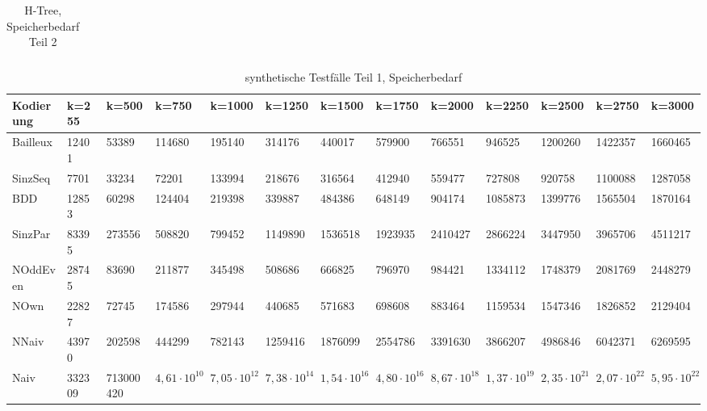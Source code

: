 \documentclass[a4,abstract=on]{scrartcl}
\begin{document}
\begin{landscape}
\begin{table}[h!]
\begin{tabular}[width=\textwidth]{|l||l|l|l|}
     \end{tabular}

     \caption{H-Tree, Speicherbedarf Teil 2}
     \label{tbl:beispieltabelle}

   \end{table}

\begin{table}[h!]
    \small
    \setlength{\tabcolsep}{0.11cm}
     \centering
     \begin{tabular}[width=\textwidth]{|l||l|l|l|l|l|l|l|l|l|l|l|l|}
	\hline
       \textbf{Kodierung}  & \textbf{k=255} & \textbf{k=500} & \textbf{k=750} &\textbf{k=1000} &\textbf{k=1250} &\textbf{k=1500} &\textbf{k=1750} &\textbf{k=2000} &\textbf{k=2250} &\textbf{k=2500} &\textbf{k=2750} &\textbf{k=3000}\\ 
	\hline
	\hline
	Bailleux & 12401 & 53389 & 114680 & 195140 & 314176 & 440017 & 579900 & 766551 & 946525 & 1200260 & 1422357 & 1660465  \\
\hline
	SinzSeq &7701 & 33234 & 72201 & 133994 & 218676 & 316564 & 412940 & 559477 & 727808 & 920758 & 1100088 & 1287058  \\
\hline
	BDD & 12853 & 60298 & 124404 & 219398 & 339887 & 484386 & 648149 & 904174 & 1085873 & 1399776 & 1565504 & 1870164  \\
\hline
	SinzPar & 83395 & 273556 & 508820 & 799452 & 1149890 & 1536518 & 1923935 & 2410427 & 2866224 & 3447950 & 3965706 & 4511217   \\
\hline
	NOddEven & 28745 & 83690 & 211877 & 345498 & 508686 & 666825 & 796970 & 984421 & 1334112 & 1748379 & 2081769 & 2448279 \\
\hline
	NOwn & 22827 & 72745 & 174586 & 297944 & 440685 & 571683 & 698608 & 883464 & 1159534 & 1547346 & 1826852 & 2129404 \\
 \hline
	NNaiv & 43970 & 202598 & 444299 & 782143 & 1259416 & 1876099 & 2554786 & 3391630 & 3866207 & 4986846 & 6042371 & 6269595 \\
\hline
	Naiv & 332309 & 713000420 &  $4,61 \cdot 10^{10}$ &  $7,05 \cdot 10^{12}$ &  $7,38 \cdot 10^{14}$ &  $1,54 \cdot 10^{16}$ &  $4,80 \cdot 10^{16}$ &  $8,67 \cdot 10^{18}$ & $1,37 \cdot 10^{19}$ & $2,35 \cdot 10^{21}$ &  $2,07 \cdot 10^{22}$ & $5,95 \cdot 10^{22}$\\
\hline
       
     \end{tabular}

     \caption{synthetische Testfälle Teil 1, Speicherbedarf}
     \label{tbl:beispieltabelle}


\end{table}
\end{landscape}
\end{document}
